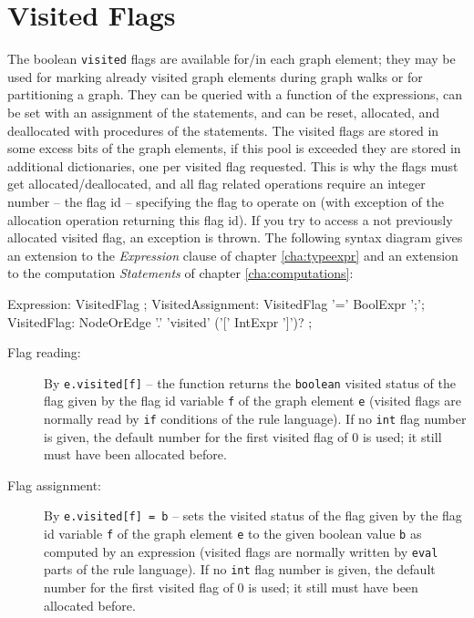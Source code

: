 \section{Visited Flags} \label{sub:visitedaccess}

The boolean \texttt{visited} flags are available for/in each graph element; 
they may be used for marking already visited graph elements during graph walks or for partitioning a graph.
They can be queried with a function of the expressions, can be set with an assignment of the statements, and can be reset, allocated, and deallocated with procedures of the statements.
The visited flags are stored in some excess bits of the graph elements, if this pool is exceeded they are stored in additional dictionaries, one per visited flag requested.
This is why the flags must get allocated/deallocated, and all flag related operations require an integer number -- the flag id -- specifying the flag to operate on (with exception of the allocation operation returning this flag id).
If you try to access a not previously allocated visited flag, an exception is thrown.
The following syntax diagram gives an extension to the \emph{Expression} clause of chapter \ref{cha:typeexpr} and an extension to the computation \emph{Statements} of chapter \ref{cha:computations}:

\begin{rail}
	Expression: VisitedFlag ;
  VisitedAssignment: VisitedFlag '=' BoolExpr ';';
	VisitedFlag: NodeOrEdge '.' 'visited' ('[' IntExpr ']')? ;
\end{rail}

\begin{description}
\item[Flag reading:] By \texttt{e.visited[f]} -- the function returns the \texttt{boolean} visited status of the flag given by the flag id variable \texttt{f} of the graph element \texttt{e} (visited flags are normally read by \texttt{if} conditions of the rule language).
If no \texttt{int} flag number is given, the default number for the first visited flag of 0 is used; it still must have been allocated before.
\item[Flag assignment:] By \texttt{e.visited[f] = b} -- sets the visited status of the flag given by the flag id variable \texttt{f} of the graph element \texttt{e} to the given boolean value \texttt{b} as computed by an expression
(visited flags are normally written by \texttt{eval} parts of the rule language).
If no \texttt{int} flag number is given, the default number for the first visited flag of 0 is used; it still must have been allocated before.
\end{description}

